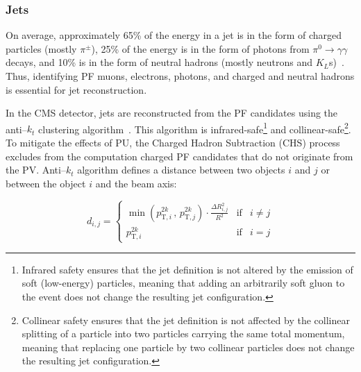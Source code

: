 \subsubsection{Jets}

On average, approximately 65\% of the energy in a jet is in the form of charged particles (mostly $\pi^\pm$), 25\% of the energy is in the form of photons from $\pi^0 \to \gamma\gamma$ decays, and 10\% is in the form of neutral hadrons (mostly neutrons and $K_L$s)~\cite{Thomson_2013}. Thus, identifying PF muons, electrons, photons, and charged and neutral hadrons is essential for jet reconstruction.

In the CMS detector, jets are reconstructed from the PF candidates using the anti--$k_t$ clustering algorithm~\cite{AntiKT_cms}. This algorithm is infrared-safe\footnote{Infrared safety ensures that the jet definition is not altered by the emission of soft (low-energy) particles, meaning that adding an arbitrarily soft gluon to the event does not change the resulting jet configuration.} and collinear-safe\footnote{Collinear safety ensures that the jet definition is not affected by the collinear splitting of a particle into two particles carrying the same total momentum, meaning that replacing one particle by two collinear particles does not change the resulting jet configuration.}. To mitigate the effects of PU, the Charged Hadron Subtraction (CHS) process~\cite{CHS_cms} excludes from the computation charged PF candidates that do not originate from the PV. Anti--$k_t$ algorithm defines a distance between two objects $i$ and $j$ or between the object $i$ and the beam axis:

\begin{equation}
    d_{i,j}=\left\{ \begin{array}{ccl}
    \displaystyle \min \left( p_{\mathrm{T},i}^{2k}  \, , \, p_{\mathrm{T},j}^{2k} \right)\cdot \frac{\Delta R_{i,j}^2}{R^2} & \mbox{if} & i \neq j \\ 
    \displaystyle p_{\mathrm{T},i}^{2k} & \mbox{if} & i=j
    \end{array}\right.
    \label{eq:antikt}
\end{equation}

